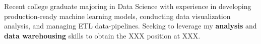 {
Recent college graduate majoring in Data Science with experience in developing production-ready machine learning models, conducting data visualization analysis, and managing ETL data-pipelines. Seeking to leverage my \textbf{analysis} and \textbf{data warehousing} skills to obtain the XXX position at XXX. 
}